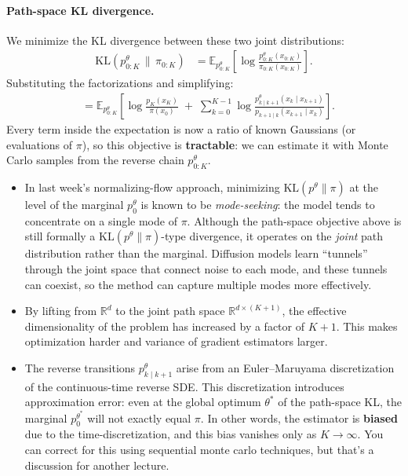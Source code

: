 \paragraph{Path-space KL divergence.}
We minimize the KL divergence between these two joint distributions:
\begin{align}
    \text{KL} (p^\theta_{0:K} \,\big\|\, \pi_{0:K} )
    &= \mathbb E_{p^\theta_{0:K}}\!\left[\log \frac{p^\theta_{0:K}(x_{0:K})}{\pi_{0:K}(x_{0:K})}\right].
\end{align}
Substituting the factorizations and simplifying:
\begin{align}
    &= \mathbb E_{p^\theta_{0:K}}\!\left[\log \frac{p_K(x_K)}{\pi(x_0)} \;+\; \sum_{k=0}^{K-1}\log \frac{p^\theta_{k\mid k+1}(x_k\mid x_{k+1})}{p_{k+1\mid k}(x_{k+1}\mid x_k)}\right].
\end{align}
Every term inside the expectation is now a ratio of known Gaussians (or evaluations of $\pi$), so this objective is \textbf{tractable}: we can estimate it with Monte Carlo samples from the reverse chain $p^\theta_{0:K}$.
\begin{itemize}
	\item In last week's normalizing-flow approach, minimizing $\text{KL}(p^\theta\|\pi)$ at the level of the marginal $p^\theta_0$ is known to be \emph{mode-seeking}: the model tends to concentrate on a single mode of $\pi$. Although the path-space objective above is still formally a $\text{KL}(p^\theta\|\pi)$-type divergence, it operates on the \emph{joint} path distribution rather than the marginal. Diffusion models learn ``tunnels'' through the joint space that connect noise to each mode, and these tunnels can coexist, so the method can capture multiple modes more effectively.
	\item By lifting from $\mathbb R^d$ to the joint path space $\mathbb R^{d \times (K+1)}$, the effective dimensionality of the problem has increased by a factor of $K+1$. This makes optimization harder and variance of gradient estimators larger.
	\item The reverse transitions $p^\theta_{k \mid k+1}$ arise from an Euler--Maruyama discretization of the continuous-time reverse SDE. This discretization introduces approximation error: even at the global optimum $\theta^*$ of the path-space KL, the marginal $p^{\theta^*}_0$ will not exactly equal $\pi$. In other words, the estimator is \textbf{biased} due to the time-discretization, and this bias vanishes only as $K \to \infty$. You can correct for this using sequential monte carlo techniques, but that's a discussion for another lecture.
\end{itemize}



